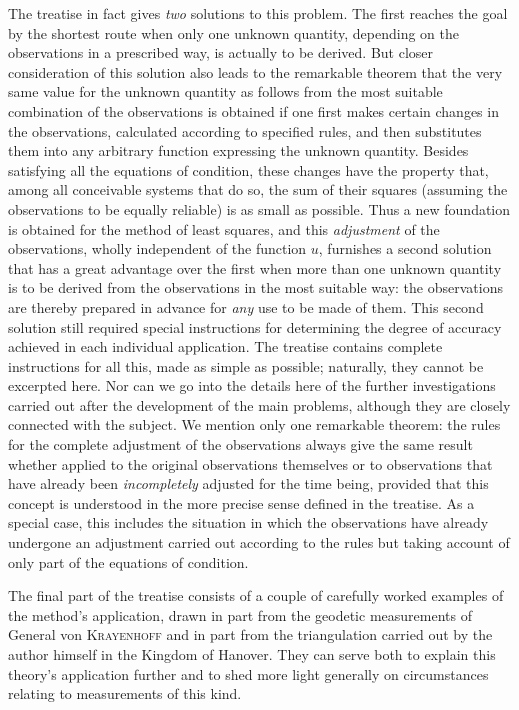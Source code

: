 The treatise in fact gives \textit{two} solutions to this problem. The first reaches the goal by the shortest route when only one unknown quantity, depending on the observations in a prescribed way, is actually to be derived. But closer consideration of this solution also leads to the remarkable theorem that the very same value for the unknown quantity as follows from the most suitable combination of the observations is obtained if one first makes certain changes in the observations, calculated according to specified rules, and then substitutes them into any arbitrary function expressing the unknown quantity. Besides satisfying all the equations of condition, these changes have the property that, among all conceivable systems that do so, the sum of their squares (assuming the observations to be equally reliable) is as small as possible. Thus a new foundation is obtained for the method of least squares, and this \textit{adjustment} of the observations, wholly independent of the function \(u\), furnishes a second solution that has a great advantage over the first when more than one unknown quantity is to be derived from the observations in the most suitable way: the observations are thereby prepared in advance for \textit{any} use to be made of them. This second solution still required special instructions for determining the degree of accuracy achieved in each individual application. The treatise contains complete instructions for all this, made as simple as possible; naturally, they cannot be excerpted here. Nor can we go into the details here of the further investigations carried out after the development of the main problems, although they are closely connected with the subject. We mention only one remarkable theorem: %
the rules for the complete adjustment of the observations always give the same result whether applied to the original observations themselves or to observations that have already been \textit{incompletely} adjusted for the time being, provided that this concept is understood in the more precise sense defined in the treatise. As a special case, this includes the situation in which the observations have already undergone an adjustment carried out according to the rules but taking account of only part of the equations of condition.

The final part of the treatise consists of a couple of carefully worked examples of the method’s application, drawn in part from the geodetic measurements of General von \textsc{Krayenhoff} and in part from the triangulation carried out by the author himself in the Kingdom of Hanover. They can serve both to explain this theory’s application further and to shed more light generally on circumstances relating to measurements of this kind.

